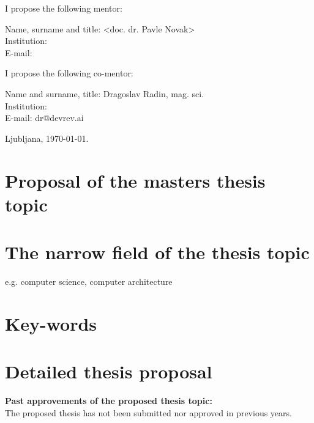\documentclass[a4paper, 12pt]{article}
\begin{document}
I propose the following mentor:

\hfill\begin{minipage}{\dimexpr\textwidth-2cm}
Name, surname and title: <doc. dr. Pavle Novak>\\
Institution: \\
E-mail:
\end{minipage}

I propose the following co-mentor:

\hfill\begin{minipage}{\dimexpr\textwidth-2cm}
Name and surname, title: Dragoslav Radin, mag. sci.\\
Institution: \\
E-mail: dr@devrev.ai
\end{minipage}

\bigskip

\hfill Ljubljana, \today.


\clearpage
\section*{Proposal of the masters thesis topic}

\section{The narrow field of the thesis topic}

 e.g. computer science, computer architecture


\section{Key-words}


\section{Detailed thesis proposal}

\textbf{Past approvements of the proposed thesis topic:}\\
The proposed thesis has not been submitted nor approved in previous years.

\end{document}
